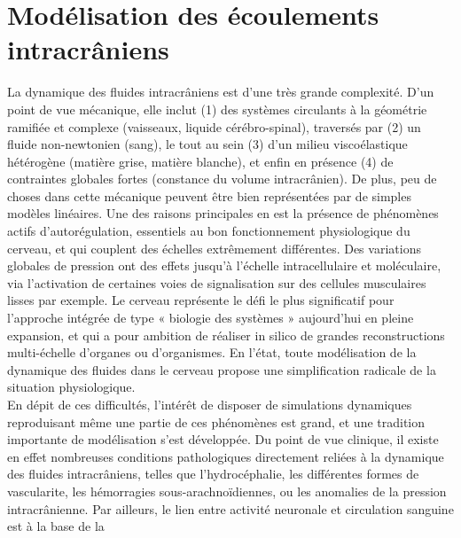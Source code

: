 
\chapter{Modélisation des écoulements intracrâniens}
	\minitoc

La dynamique des fluides intracrâniens est d'une très grande complexité. D'un point de vue
mécanique, elle inclut (1) des systèmes circulants à la géométrie ramifiée et complexe (vaisseaux,
liquide cérébro-spinal), traversés par (2) un fluide non-newtonien (sang), le tout au sein (3) d'un milieu
viscoélastique hétérogène (matière grise, matière blanche), et enfin en présence (4) de contraintes
globales fortes (constance du volume intracrânien). De plus, peu de choses dans cette mécanique
peuvent être bien représentées par de simples modèles linéaires. Une des raisons principales en est la
présence de phénomènes actifs d'autorégulation, essentiels au bon fonctionnement physiologique du
cerveau, et qui couplent des échelles extrêmement différentes. Des variations globales de pression ont
des effets jusqu'à l'échelle intracellulaire et moléculaire, via l'activation de certaines voies de
signalisation sur des cellules musculaires lisses par exemple. Le cerveau représente le défi le plus
significatif pour l'approche intégrée de type « biologie des systèmes » aujourd'hui en pleine expansion,
et qui a pour ambition de réaliser in silico de grandes reconstructions multi-échelle d'organes ou
d'organismes. En l'état, toute modélisation de la dynamique des fluides dans le cerveau propose une
simplification radicale de la situation physiologique.\\
En dépit de ces difficultés, l'intérêt de disposer de simulations dynamiques reproduisant même
une partie de ces phénomènes est grand, et une tradition importante de modélisation s'est
développée. Du point de vue clinique, il existe en effet nombreuses conditions pathologiques
directement reliées à la dynamique des fluides intracrâniens, telles que l'hydrocéphalie, les différentes
formes de vascularite, les hémorragies sous-arachnoïdiennes, ou les anomalies de la pression
intracrânienne. Par ailleurs, le lien entre activité neuronale et circulation sanguine est à la base de la
